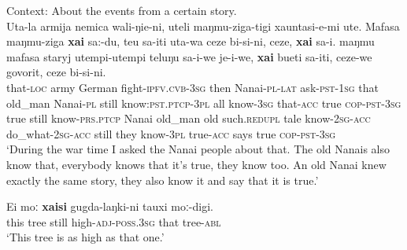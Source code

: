 \begin{exe}
	\ex Context: About the events from a certain story.\\
	\gll Uta-la armija nemica wali-ŋie-ni, uteli maŋmu-ziga-tigi xauntasi-e-mi ute. Mafasa maŋmu-ziga \textbf{xai} sa:-du, teu sa-iti uta-wa ceze bi-si-ni, ceze, \textbf{xai} sa-i. maŋmu mafasa {staryj} utempi-utempi teluŋu sa-i-we je-i-we, \textbf{xai} bueti sa-iti, ceze-we {govorit}, ceze bi-si-ni.\\
	that-\textsc{loc} army German fight-\textsc{ipfv}.\textsc{cvb}-3\textsc{sg} then Nanai-\textsc{pl}-\textsc{lat} ask-\textsc{pst}-1\textsc{sg} that old\_man Nanai-\textsc{pl} still know:\textsc{pst}.\textsc{ptcp}-3\textsc{pl} all know-3\textsc{sg} that-\textsc{acc} true \textsc{cop}-\textsc{pst}-3\textsc{sg} true still know-\textsc{prs}.\textsc{ptcp} Nanai old\_man {old} such.\textsc{redupl} tale know-2\textsc{sg}-\textsc{acc} do\_what-2\textsc{sg}-\textsc{acc} still they know-3\textsc{pl} true-\textsc{acc} {says} true \textsc{cop}-\textsc{pst}-3\textsc{sg}\\
	\glt \lq During the war time I asked the Nanai people about that. The old Nanais also know that, everybody knows that it’s true, they know too. An old Nanai knew exactly the same story, they also know it and say that it is true.' \parencite[An old woman and her tiger cub]{NikolaevaEtAl2019}
	
	\ex \label{exAppendixUdiheAdditiveEquative}
	\gll Ei moː \textbf{xaisi} gugda-laŋki-ni tauxi moː-digi.\\
	this tree still high-\textsc{adj}-\textsc{poss}.3\textsc{sg} that tree-\textsc{abl}\\
	\glt \lq This tree is as high as that one.' \parencite[187]{NikolaevaTolskaya2001}
\end{exe}
\largerpage[2]
